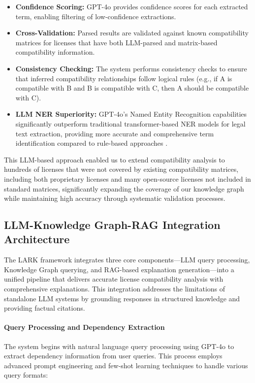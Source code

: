 \begin{itemize}
    \item \textbf{Confidence Scoring:} GPT-4o provides confidence scores for each extracted term, enabling filtering of low-confidence extractions.
    \item \textbf{Cross-Validation:} Parsed results are validated against known compatibility matrices for licenses that have both LLM-parsed and matrix-based compatibility information.
    \item \textbf{Consistency Checking:} The system performs consistency checks to ensure that inferred compatibility relationships follow logical rules (e.g., if A is compatible with B and B is compatible with C, then A should be compatible with C).
    \item \textbf{LLM NER Superiority:} GPT-4o's Named Entity Recognition capabilities significantly outperform traditional transformer-based NER models \cite{devlin2018bert,liu2019roberta,zhang2020ner,liu2021legalner} for legal text extraction, providing more accurate and comprehensive term identification compared to rule-based approaches \cite{zhang2024transformerner}.
\end{itemize}

This LLM-based approach enabled us to extend compatibility analysis to hundreds of licenses that were not covered by existing compatibility matrices, including both proprietary licenses and many open-source licenses not included in standard matrices, significantly expanding the coverage of our knowledge graph while maintaining high accuracy through systematic validation processes.

\subsection{LLM-Knowledge Graph-RAG Integration Architecture}
\label{sec:llm_kg_rag_integration}

The LARK framework integrates three core components—LLM query processing, Knowledge Graph querying, and RAG-based explanation generation—into a unified pipeline that delivers accurate license compatibility analysis with comprehensive explanations. This integration addresses the limitations of standalone LLM systems by grounding responses in structured knowledge and providing factual citations.

\paragraph{Query Processing and Dependency Extraction}
The system begins with natural language query processing using GPT-4o to extract dependency information from user queries. This process employs advanced prompt engineering and few-shot learning techniques to handle various query formats:

